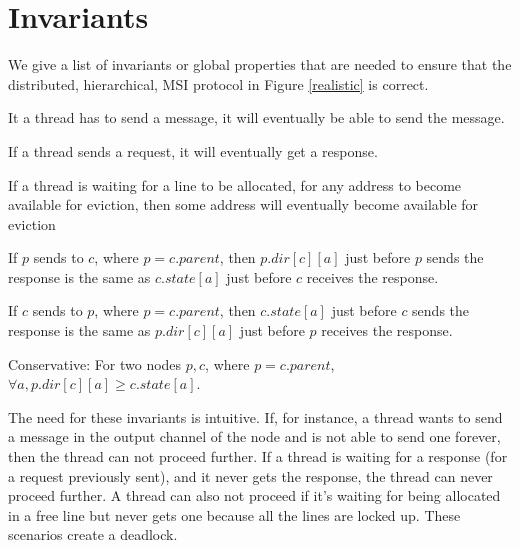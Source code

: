 \section{Invariants}
\label{sec:properties}

We give a list of invariants or global properties that are needed to ensure that
the distributed, hierarchical, MSI protocol in Figure \ref{realistic} is correct.

\begin{theorem}
It a thread has to send a message, it will eventually be able to send the
message.
\label{canSend}
\end{theorem}

\begin{theorem}
If a thread sends a request, it will eventually get a response.
\label{willRecv}
\end{theorem}

\begin{theorem}
If a thread is waiting for a line to be allocated, \ie for any address to become
available for eviction, then some address will eventually become available for
eviction
\label{evictDead}
\end{theorem}

\begin{theorem}
If $p$ sends  to $c$, where $p = c.parent$, then $p.dir[c][a]$
just before $p$ sends the response is the same as $c.state[a]$ just before $c$
receives the response.
\label{pcSame}
\end{theorem}

\begin{theorem}
If $c$ sends  to $p$, where $p = c.parent$, then $c.state[a]$
just before $c$ sends the response is the same as $p.dir[c][a]$ just before $p$
receives the response.
\label{cpSame}
\end{theorem}

\begin{theorem}
Conservative: For two nodes $p, c$, where $p = c.parent$, $\forall a,
p.dir[c][a] \ge c.state[a]$.
\label{conservative}
\end{theorem}

The need for these invariants is intuitive. If, for instance, a thread wants to
send a message in the output channel of the node and is not able to send one
forever, then the thread can not proceed further. If a thread is waiting for a
response (for a request previously sent), and it never gets the response, the
thread can never proceed further. A thread can also not proceed if it's waiting
for being allocated in a free line but never gets one because all the lines are
locked up. These scenarios create a deadlock.

